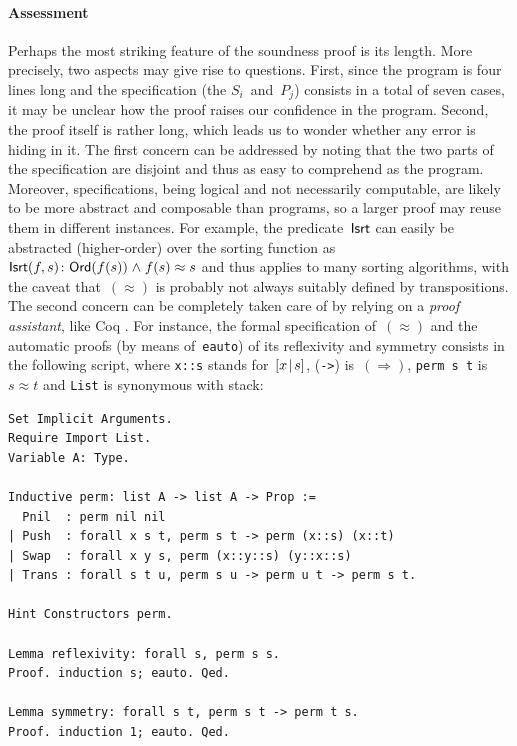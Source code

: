 \paragraph{Assessment}

Perhaps the most striking feature of the soundness proof is its
length. More precisely, two aspects may give rise to questions. First,
since the program is four lines long and the specification (the
\(S_i\)~and~\(P_j\)) consists in a total of seven cases, it may be
unclear how the proof raises our confidence in the program. Second,
the proof itself is rather long, which leads us to wonder whether any
error is hiding in it. The first concern can be addressed by noting
that the two parts of the specification are disjoint and thus as easy
to comprehend as the program. Moreover, specifications, being logical
and not necessarily computable, are likely to be more abstract and
composable than programs, so a larger proof may reuse them in
different instances. For example, the predicate~\(\textsf{Isrt}\)
can easily be abstracted (higher\hyp{}order) over the sorting function
as \(\textsf{Isrt}({f,s}) \colon \textsf{Ord}({f(s)}) \mathrel{\wedge} f(s)
\approx s\) and
thus applies to many sorting algorithms, with the caveat
that~\((\approx)\) is probably not always suitably defined by
transpositions. The second concern can be completely taken care of by
relying on a \emph{proof assistant}, like
\textsf{Coq} \citep{BertotCasteran_2004}. For instance, the formal
specification of~\((\approx)\) and the automatic proofs (by means
of~\texttt{eauto}) of its reflexivity and symmetry consists in the
following script, where \verb|x::s| stands for~\([{x}\!\mid\!{s}]\),
(\verb|->|) is~\((\Rightarrow)\), \verb|perm s t| is~\(s \approx t\)
and \verb|List| is synonymous with stack:
\begin{verbatim}
Set Implicit Arguments.
Require Import List.
Variable A: Type.

Inductive perm: list A -> list A -> Prop :=
  Pnil  : perm nil nil
| Push  : forall x s t, perm s t -> perm (x::s) (x::t)
| Swap  : forall x y s, perm (x::y::s) (y::x::s)
| Trans : forall s t u, perm s u -> perm u t -> perm s t.

Hint Constructors perm.

Lemma reflexivity: forall s, perm s s.
Proof. induction s; eauto. Qed.

Lemma symmetry: forall s t, perm s t -> perm t s.
Proof. induction 1; eauto. Qed.
\end{verbatim}

